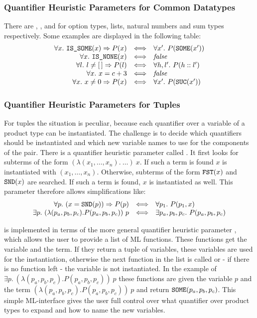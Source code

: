 \subsubsection{Quantifier Heuristic Parameters for Common Datatypes}

There are , ,  and  for option types, lists,
natural numbers and sum types respectively.
Some examples are displayed in the following table:
%
\[\begin{array}{r@{\quad \Longleftrightarrow \quad}l}
\forall x.\ \holtxt{IS\_SOME}(x) \Rightarrow P(x) & \forall x'.\ P (\holtxt{SOME}(x')) \\
\forall x.\ \holtxt{IS\_NONE}(x)& \textit{false} \\
\forall l.\ l \neq [\,] \Rightarrow P(l)& \forall h, l'.\ P(h::l')  \\
\forall x.\ x = c + 3& \textit{false} \\
\forall x.\ x \neq 0 \Rightarrow P(x)& \forall x'.\ P(\holtxt{SUC}(x'))
\end{array}\]

\subsubsection{Quantifier Heuristic Parameters for Tuples}

For tuples the situation is peculiar, because each quantifier over a variable of a product type
can be instantiated. The challenge is to decide which quantifiers should be instantiated and
which new variable names to use for the components of the pair.
There is a quantifier heuristic parameter called . It first looks for
subterms of the form $(\lambda (x_1, \ldots, x_n).\ \ldots)\ x$. If such a term is found $x$ is instantiated with
$(x_1, \ldots, x_n)$. Otherwise, subterms of the form $\holtxt{FST}(x)$ and $\holtxt{SND}(x)$ are searched. If such a term
is found, $x$ is instantiated as well. This parameter therefore allows simplifications like:
%
\[\begin{array}{r@{\quad \Longleftrightarrow \quad}l}
\forall p.\ (x = \holtxt{SND}(p)) \Rightarrow P(p)& \forall p_1.\ P(p_1, x) \\
\exists p.\ (\lambda (p_a, p_b, p_c). P(p_a, p_b, p_c))\ p & \exists p_a, p_b, p_c.\ P(p_a, p_b, p_c)
\end{array}\]

 is implemented in terms of the more general
quantifier heuristic parameter , which allows the
user to provide a list of ML functions. These functions get the
variable and the term. If they return a tuple of variables, these
variables are used for the instantiation, otherwise the next function
in the list is called or - if there is no function left - the variable
is not instantiated. In the example of $\exists p.\ (\lambda (p_a,
p_b, p_c). P(p_a, p_b, p_c))\ p$ these functions are given the
variable $p$ and the term $(\lambda (p_a, p_b, p_c). P(p_a, p_b,
p_c))\ p$ and return $\holtxt{SOME} (p_a, p_b, p_c)$.  This simple
ML-interface gives the user full control over what quantifier over
product types to expand and how to name the new variables.

